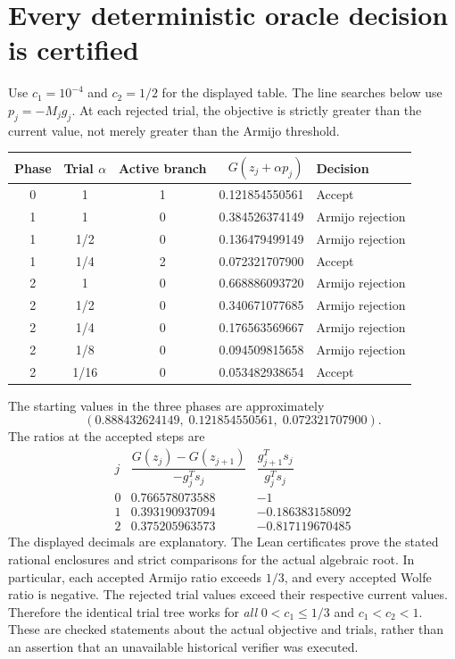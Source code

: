\section{Every deterministic oracle decision is certified}\label{comp:trial_table}
Use $c_1=10^{-4}$ and $c_2=1/2$ for the displayed table. The line searches below use $p_j=-M_jg_j$. At each rejected trial, the objective is strictly greater than the current value, not merely greater than the Armijo threshold.
\begin{center}\small
\begin{tabular}{cccrl}\toprule
Phase & Trial $\alpha$ & Active branch & $G(z_j+\alpha p_j)$ & Decision\\\midrule
0&1&1&0.121854550561&Accept\\\midrule
1&1&0&0.384526374149&Armijo rejection\\
1&1/2&0&0.136479499149&Armijo rejection\\
1&1/4&2&0.072321707900&Accept\\\midrule
2&1&0&0.668886093720&Armijo rejection\\
2&1/2&0&0.340671077685&Armijo rejection\\
2&1/4&0&0.176563569667&Armijo rejection\\
2&1/8&0&0.094509815658&Armijo rejection\\
2&1/16&0&0.053482938654&Accept\\\bottomrule
\end{tabular}
\end{center}
The starting values in the three phases are approximately
\[
 (0.888432624149,\;0.121854550561,\;0.072321707900).
\]
The ratios at the accepted steps are
\[
\begin{array}{c|rr}
 j & \dfrac{G(z_j)-G(z_{j+1})}{-g_j^Ts_j}
 &\dfrac{g_{j+1}^Ts_j}{g_j^Ts_j}\\\hline
0&0.766578073588&-1\\
1&0.393190937094&-0.186383158092\\
2&0.375205963573&-0.817119670485
\end{array}
\]
The displayed decimals are explanatory. The Lean certificates prove the stated rational enclosures and strict comparisons for the actual algebraic root. In particular, each accepted Armijo ratio exceeds $1/3$, and every accepted Wolfe ratio is negative. The rejected trial values exceed their respective current values. Therefore the identical trial tree works for \emph{all} $0<c_1\le1/3$ and $c_1<c_2<1$. These are checked statements about the actual objective and trials, rather than an assertion that an unavailable historical verifier was executed.

